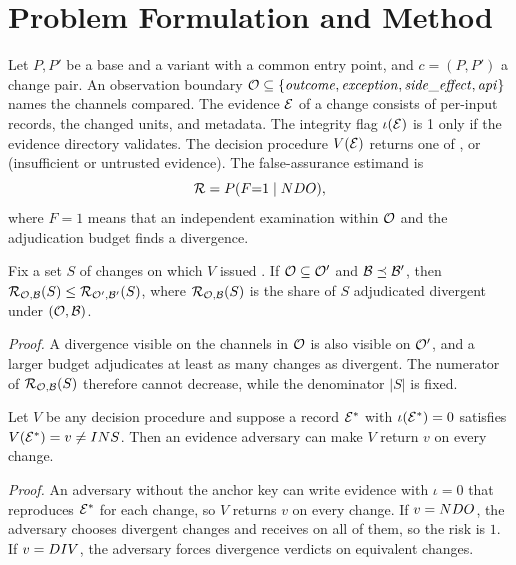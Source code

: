 \documentclass{ieeeaccess}
\begin{document}
\section{Problem Formulation and Method}\label{sec:problem}\label{sec:approach}
Let $P,P'$ be a base and a variant with a common entry point, and $c=(P,P')$ a change pair. An observation boundary $\mathcal{O}\subseteq\{{\it outcome},{\it exception},{\it side\_effect},{\it api}\}$ names the channels compared. The evidence $\mathcal{E}$ of a change consists of per-input records, the changed units, and metadata. The integrity flag $\iota(\mathcal{E})$ is 1 only if the evidence directory validates. The decision procedure $V(\mathcal{E})$ returns one of \DIV{}, \NDO{} or \INS{} (insufficient or untrusted evidence). The false-assurance estimand is
\[
\mathcal{R}=P(F{=}1\mid NDO{}),
\]
where $F{=}1$ means that an independent examination within $\mathcal{O}$ and the adjudication budget finds a divergence.

\begin{proposition}[Monotonicity]\label{prop:mono}
Fix a set $S$ of changes on which $V$ issued \NDO{}. If $\mathcal{O}\subseteq\mathcal{O}'$ and $\mathcal{B}\preceq\mathcal{B}'$, then $\mathcal{R}_{\mathcal{O},\mathcal{B}}(S)\le\mathcal{R}_{\mathcal{O}',\mathcal{B}'}(S)$, where $\mathcal{R}_{\mathcal{O},\mathcal{B}}(S)$ is the share of $S$ adjudicated divergent under $(\mathcal{O},\mathcal{B})$.
\end{proposition}
\emph{Proof.} A divergence visible on the channels in $\mathcal{O}$ is also visible on $\mathcal{O}'$, and a larger budget adjudicates at least as many changes as divergent. The numerator of $\mathcal{R}_{\mathcal{O},\mathcal{B}}(S)$ therefore cannot decrease, while the denominator $|S|$ is fixed.

\begin{proposition}\label{prop:integrity}
Let $V$ be any decision procedure and suppose a record $\mathcal{E}^\ast$ with $\iota(\mathcal{E}^\ast)=0$ satisfies $V(\mathcal{E}^\ast)=v\neq INS{}$. Then an evidence adversary can make $V$ return $v$ on every change.
\end{proposition}
\emph{Proof.} An adversary without the anchor key can write evidence with $\iota=0$ that reproduces $\mathcal{E}^\ast$ for each change, so $V$ returns $v$ on every change. If $v=NDO{}$, the adversary chooses divergent changes and receives \NDO{} on all of them, so the risk is $1$. If $v=DIV{}$, the adversary forces divergence verdicts on equivalent changes.
\end{document}
